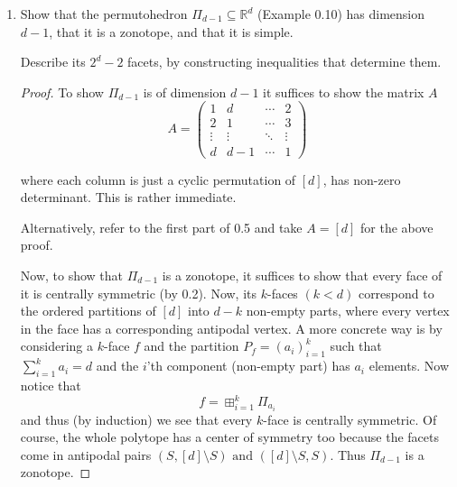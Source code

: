 \documentclass{article}
\begin{document}
\begin{enumerate}
\begin{proof}
    Conversely, if every face of a polytope is centrally symmetric, it must be able to be written as a minkowski sum of singleton vectors, which means it is indeed a zonotope. Alternatively, note that every 2-face must be a $2n$-gon, which can be represented as the projection of a $n$-cube. We can inductively show that if a centrally symmetric polytope has zonotopes as facets, then it is a zonotope as well. The claim follows.
\end{proof}

\item Show that the permutohedron $\Pi_{d-1} \subseteq \mathbb{R}^d$ (Example 0.10) has dimension $d-1$, that it is a zonotope, and that it is simple.

\smallskip
Describe its $2^d-2$ facets, by constructing inequalities that determine them.

\begin{proof}

To show $\Pi_{d-1}$ is of dimension $d-1$ it suffices to show the matrix $A$
\[A = \begin{pmatrix}
1 & d & \cdots & 2 \\
2 & 1 & \cdots & 3 \\
\vdots & \vdots & \ddots & \vdots \\
d & d-1 & \cdots & 1 
\end{pmatrix}\]

where each column is just a cyclic permutation of $[d]$, has non-zero determinant. This is rather immediate.


\begin{remark}
    Alternatively, refer to the first part of 0.5 and take $A = [d]$ for the above proof.
\end{remark}

Now, to show that $\Pi_{d-1}$ is a zonotope, it suffices to show that every face of it is centrally symmetric (by 0.2). Now, its $k$-faces $(k<d)$ correspond to the ordered partitions of $[d]$ into $d-k$ non-empty parts, where every vertex in the face has a corresponding antipodal vertex. A more concrete way is by considering a $k$-face $f$ and the partition $P_f = (a_i)_{i=1}^k$ such that $\sum_{i=1}^k a_i = d$ and the $i$'th component (non-empty part) has $a_i$ elements. Now notice that
\[f = \boxplus_{i=1}^k \Pi_{a_i}\]
and thus (by induction) we see that every $k$-face is centrally symmetric. Of course, the whole polytope has a center of symmetry too because the facets come in antipodal pairs $(S, [d]\setminus S) \text{ and } ([d]\setminus S, S)$. Thus $\Pi_{d-1}$ is a zonotope.


\end{proof}
\end{enumerate}
\end{document}
